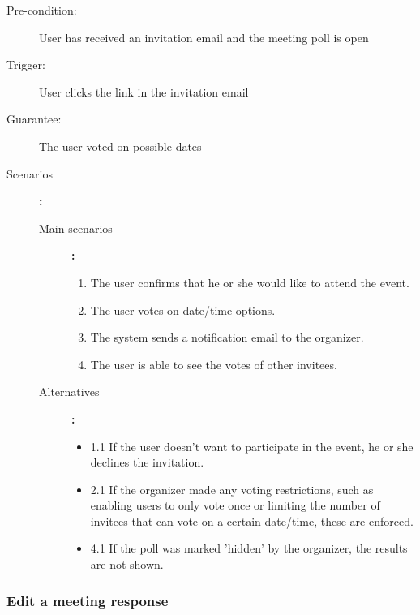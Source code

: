 \begin{description}
	\item[Pre-condition:] User has received an invitation email and the meeting poll is open
	\item[Trigger:] User clicks the link in the invitation email
	\item[Guarantee:] The user voted on possible dates
	\item[Scenarios]\textbf{:}\\
				\begin{description}
					\item[Main scenarios]\textbf{:}\\
								\begin{enumerate}
									\item The user confirms that he or she would like to attend the event.
									\item The user votes on date/time options.
									\item The system sends a notification email to the organizer.
									\item The user is able to see the votes of other invitees.
								\end{enumerate}
					\item[Alternatives]\textbf{:}\\
								\begin{itemize}
									\item 1.1 If the user doesn't want to participate in the event, he or she declines the invitation.	
									\item 2.1 If the organizer made any voting restrictions, such as enabling users to only vote once or limiting the number of invitees that can vote on a certain date/time, these are enforced.
									\item 4.1 If the poll was marked 'hidden' by the organizer, the results are not shown.
								\end{itemize}
				\end{description}
\end{description}

\subsubsection{Edit a meeting response}


